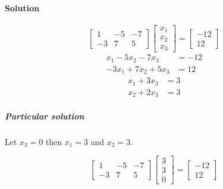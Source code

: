 \documentclass{article}
\begin{document}
\begin{enumerate}[label=(\alph*)]
                    \paragraph{Solution}
                        \[
                        \begin{bmatrix} 1 & -5 & -7 \\ -3 & 7 & 5 \end{bmatrix}
                        \begin{bmatrix}x_1\\x_2\\x_3\end{bmatrix}
                        =
                        \begin{bmatrix}-12\\12\end{bmatrix}
                        \]
                        \begin{align*}
                            x_1 - 5x_2 - 7x_3 &= -12 \\
                            -3x_1 + 7x_2 + 5x_3 &= 12
                        \end{align*}
                        \begin{align*}
                            x_1 + 3x_3 &= 3 \\
                            x_2 + 2x_3 &= 3
                        \end{align*}
                        \subparagraph{Particular solution}
                            Let $x_3=0$ then $x_1=3$ and $x_2=3$.
                        \begin{solutioncheck}
                            \[
                            \begin{bmatrix} 1 & -5 & -7 \\ -3 & 7 & 5 \end{bmatrix}
                            \begin{bmatrix}3\\3\\0\end{bmatrix}
                            =
                            \begin{bmatrix}-12\\12\end{bmatrix}
                            \]
                        \end{solutioncheck}



            \end{enumerate}   

 
\end{document}
